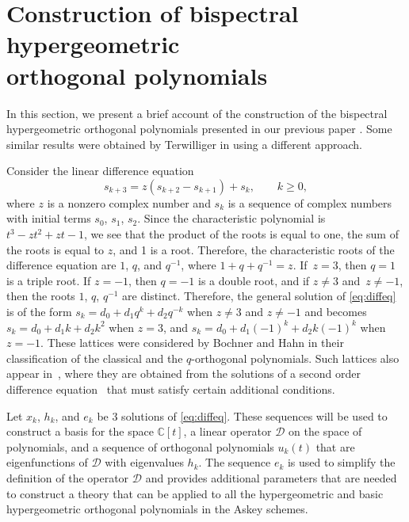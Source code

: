 \documentclass[pdftex]{sigma}
\def\cD{\mathcal D}
\numberwithin{equation}{section}
\begin{document}
\section[Construction of bispectral hypergeometric orthogonal polynomials]{Construction of bispectral hypergeometric\\ orthogonal polynomials}\label{section2}

In this section, we present a brief account of the construction of the
 bispectral hypergeometric orthogonal polynomials presented in our previous paper \cite{Uni}. Some similar results were obtained by Terwilliger in \cite{Terw,Ter3,Ter2} using a different approach.

Consider the linear difference equation
\begin{equation}\label{eq:diffeq}
 s_{k+3} = z ( s_{k+2} -s_{k+1}) + s_k, \qquad k\ge 0,
\end{equation}
where $z$ is a nonzero complex number and $s_k$ is a sequence of complex numbers with initial terms $s_0$, $s_1$, $s_2$. Since the characteristic polynomial is $t^3 - z t^2 + z t -1$, we see that the product of the roots is equal to one, the sum of the roots is equal to $z$, and 1 is a root. Therefore,
the characteristic roots of the difference equation are $1$, $q$, and $q^{-1}$, where $1 + q + q^{-1}=z$. If~${z=3}$, then $q=1$ is a triple root. If $z=-1$, then $q=-1$ is a double root, and if $z\ne 3$ and~${z\ne -1}$, then the roots $1$, $q$, $q^{-1}$ are distinct. Therefore, the general solution of \eqref{eq:diffeq} is of the form
$s_k= d_0 + d_1 q^k + d_2 q^{-k}$ when $z\ne 3$ and $z \ne -1$ and becomes $s_k=d_0 + d_1 k + d_2 k^2$ when $z=3$, and $s_k= d_0 +d_1 (-1)^k + d_2 k ( -1)^k$ when $z=-1$. These lattices were considered by Bochner and Hahn in their classification of the classical and the $q$-orthogonal polynomials. Such lattices also appear in~\cite{NSU}, where they are obtained from the solutions of a second order difference equation~\mbox{\cite[equation~(3.1.12)]{NSU}} that must satisfy certain additional conditions.

Let $x_k$, $h_k$, and $e_k$ be 3 solutions of \eqref{eq:diffeq}. These sequences will be used to construct a basis for the space ${\mathbb C}[t]$, a linear operator $\cD$ on the space of polynomials, and a sequence of orthogonal polynomials $u_k(t)$ that are eigenfunctions of $\cD$ with eigenvalues $h_k$. The sequence $e_k$ is used to simplify the definition of the operator $\cD$ and provides additional parameters that are needed to construct a theory that can be applied to all the hypergeometric and basic hypergeometric orthogonal polynomials in the Askey schemes.
\end{document}
